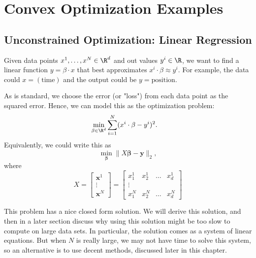 



\section{Convex Optimization Examples}
\subsection{Unconstrained Optimization: Linear Regression}

Given data points $x^1, \dots, x^N \in \R^d$ and out values $y^i \in \R$, we want to find a linear function $y = \beta \cdot x$ that best approximates $x^i \cdot \beta \approx y^i$.  For example, the data could $x = (\text{time})$ and the output could be $y = \text{position}$.  





As is standard, we choose the error (or "loss") from each data point as the squared error.  Hence, we can model this as the optimization problem:
\begin{align}
\label{eq:least-squares}
\min_{\beta \in \R^d} & \sum_{i=1}^N (x^i \cdot \beta - y^i)^2.
\end{align}
Equivalently, we could write this as 
\[
\min_{\mathbf{\beta}} \|X \mathbf{\beta} -\mathbf{y}\|_2,
\]
where 
$$X = 
\begin{bmatrix}
\mathbf{x}^1\\
\vdots \\
\mathbf{x}^N
\end{bmatrix}
= 
\begin{bmatrix}
x^1_1 & x^1_2 & \dots & x^1_d\\
\vdots \\
x^N_1 & x^N_2 & \dots & x^N_d
\end{bmatrix}
$$

This problem has a nice closed form solution.  We will derive this solution, and then in a later section discuss why using this solution might be too  slow to compute on large data sets.  In particular, the solution comes as a system of linear equations.  But when $N$ is really large, we may not have time to solve this system, so an alternative is to use decent methods, discussed later in this chapter.

